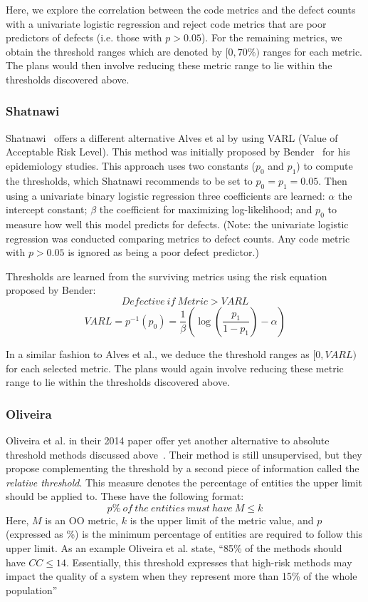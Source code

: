 Here, we explore the correlation between the code metrics 
and the defect counts with a univariate logistic regression and reject 
code metrics that are poor predictors of defects (i.e.  those with $p > 
0.05$). For the remaining metrics, we obtain the threshold ranges which are denoted by $[0, 70\%)$ ranges for each metric. The plans would then involve reducing these metric range to lie within the thresholds discovered above.

\subsubsection{Shatnawi}

Shatnawi~\citep{shatnawi} offers a different alternative Alves et al by using VARL (Value of Acceptable Risk Level). This method was initially proposed by Bender~\citep{bender99} for his epidemiology studies. This approach uses two constants ($p_0$ and $p_1$) to compute the thresholds, which Shatnawi recommends to be set to $p_0=p_1=0.05$. Then using a univariate binary logistic regression three coefficients are learned:
$\alpha$ the intercept constant;
$\beta$ the coefficient for maximizing log-likelihood;
and $p_0$ to 
measure how well this model predicts for defects. (Note: the univariate 
logistic regression was conducted comparing metrics to defect counts. Any 
code metric with $p>0.05$ is ignored as being a poor defect predictor.)

Thresholds are learned from the surviving metrics using
the risk equation proposed by Bender:
$$ \mathit{Defective\ if}\ \mathit{Metric} > \mathit{VARL}$$
$$
	\mathit{VARL} = p^{-1}(p_0) = \frac{1}{\beta }\left( {\log \left( 
		{\frac{{{p_1}}}{{1 - {p_1}}}} \right) - \alpha } \right)
$$

In a similar fashion to Alves et al., we deduce the threshold ranges as $[0, VARL)$ for each selected metric. The plans would again involve reducing these metric range to lie within the thresholds discovered above.

\subsubsection{Oliveira}
Oliveira et al. in their 2014 paper offer yet another alternative to absolute threshold methods discussed above~\citep{oliveira}. Their method is still unsupervised, but they propose complementing the threshold by a second piece of information called the \textit{relative threshold}. This measure denotes the percentage of entities the upper limit should be applied to. These have the following format:
\[p\%\ of\ the\ entities\ must\ have\ M\leq k\]
Here, $M$ is an OO metric, $k$ is the upper limit of the metric value, and $p$ (expressed as \%) is the minimum percentage of entities are required to follow this upper limit. As an example Oliveira et al. state, ``85\% of the methods should have $CC \leq 14$. Essentially, this threshold expresses that high-risk methods may impact the quality of a system when they represent more than 15\% of the whole population''

